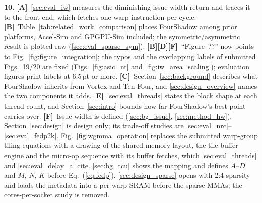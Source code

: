 \vspace{1pt}
\noindent\textbf{10.} \textbf{[A]}~\ref{sec:eval_iw} measures the diminishing issue-width return
and traces it to the front end, which fetches one warp instruction per cycle.
\textbf{[B]}~Table~\ref{tab:related_work_comparison} places FourShadow among prior platforms,
Accel-Sim and GPGPU-Sim included; the symmetric/asymmetric result is plotted raw
(\ref{sec:eval_sparse_sym}). \textbf{[B][D][F]}~``Figure~??'' now points to
Fig.~\ref{fig:figure_integration}; the typos and the overlapping labels of submitted Figs.~19/20
are fixed (Figs.~\ref{fig:asic_nt} and~\ref{fig:iw_area_scaling}); evaluation figures print labels
at 6.5\,pt or more. \textbf{[C]}~Section~\ref{sec:background} describes what FourShadow inherits
from Vortex and Ten-Four, and \ref{sec:design_overview} names the two components it adds.
\textbf{[E]}~\ref{sec:eval_threads} states the block shape at each thread count, and
Section~\ref{sec:intro} bounds how far FourShadow's best point carries over.
\textbf{[F]}~Issue width is defined (\ref{sec:bg_issue}, \ref{sec:method_hw}).
Section~\ref{sec:design} is design only; its trade-off studies are
\ref{sec:eval_nrc}--\ref{sec:eval_fedp2k}. Fig.~\ref{fig:wgmma_operation} replaces the submitted
warp-group tiling equations with a drawing of the shared-memory layout, the tile-buffer engine
and the micro-op sequence with its buffer fetches, which \ref{sec:eval_threads} and
\ref{sec:eval_delay_a} cite. \ref{sec:bg_tcu} shows the mapping and defines $A$--$D$
and $M$, $N$, $K$ before Eq.~(\ref{eq:fedp}). \ref{sec:design_sparse} opens with 2:4 sparsity and
loads the metadata into a per-warp SRAM before the sparse MMAs; the cores-per-socket study is
removed.\par

\clearpage
{}
